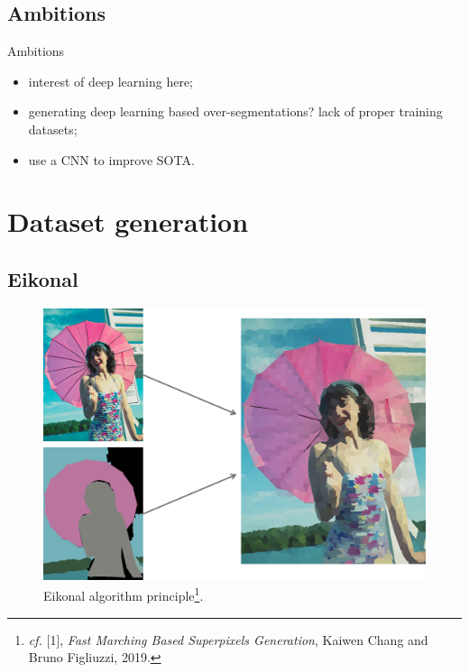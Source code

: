 \documentclass[9pt]{beamer}
\begin{document}
\subsection{Ambitions}
\begin{frame}{Ambitions}
    \begin{itemize}
        \item interest of deep learning here;
        \vspace{5mm}
        \item generating deep learning based over-segmentations? lack of proper training datasets;
        \vspace{5mm}
        \item use a CNN to improve SOTA.
    \end{itemize}
\end{frame}
\section{Dataset generation}
\subsection{Eikonal}
\begin{frame}
    \begin{figure}
    \centering
    \includegraphics[width=.7\textwidth]{pics/eikonal.png}
    \caption{Eikonal algorithm principle\footnote{\textit{cf.} [1], \textit{Fast Marching Based Superpixels Generation}, Kaiwen Chang and Bruno Figliuzzi, 2019.}.}
    \end{figure}
\end{frame}
\end{document}
